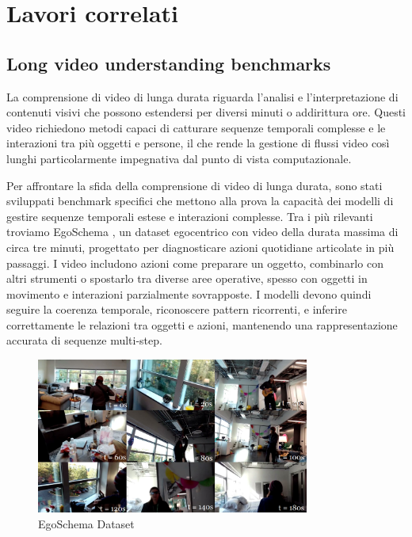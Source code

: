 \chapter{Lavori correlati}
\section{Long video understanding benchmarks}
La comprensione di video di lunga durata riguarda l'analisi e l'interpretazione di contenuti visivi che possono estendersi per diversi minuti o addirittura ore. Questi video richiedono metodi capaci di catturare sequenze temporali complesse e le interazioni tra più oggetti e persone, il che rende la gestione di flussi video così lunghi particolarmente impegnativa dal punto di vista computazionale.

Per affrontare la sfida della comprensione di video di lunga durata, sono stati sviluppati benchmark specifici che mettono alla prova la capacità dei modelli di gestire sequenze temporali estese e interazioni complesse. Tra i più rilevanti troviamo EgoSchema \cite{mangalam2023egoschemadiagnosticbenchmarklongform}, un dataset egocentrico con video della durata massima di circa tre minuti, progettato per diagnosticare azioni quotidiane articolate in più passaggi. I video includono azioni come preparare un oggetto, combinarlo con altri strumenti o spostarlo tra diverse aree operative, spesso con oggetti in movimento e interazioni parzialmente sovrapposte. I modelli devono quindi seguire la coerenza temporale, riconoscere pattern ricorrenti, e inferire correttamente le relazioni tra oggetti e azioni, mantenendo una rappresentazione accurata di sequenze multi-step.

\begin{figure}[H]
    \centering
    \includegraphics[width=0.8\textwidth]{Images/egoschema.png}
    \caption{EgoSchema Dataset}
    \label{fig:egoschema}
\end{figure}

